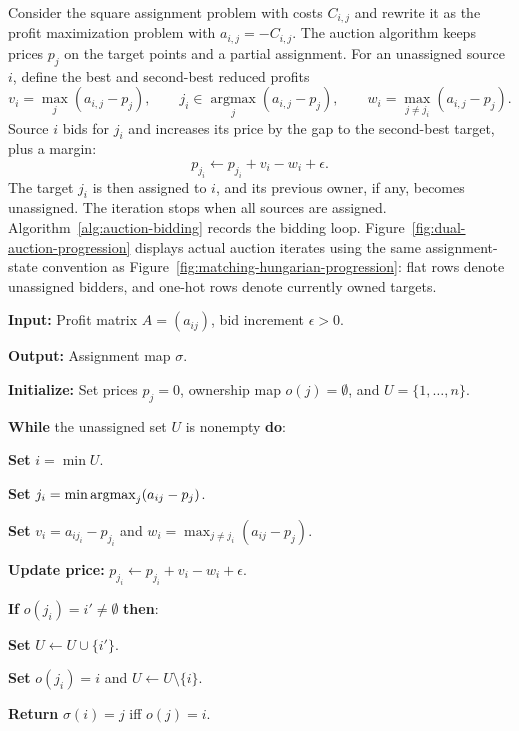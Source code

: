 Consider the square assignment problem with costs $C_{i,j}$ and rewrite it as the profit maximization problem with $a_{i,j}=-C_{i,j}$. The auction algorithm keeps prices $p_j$ on the target points and a partial assignment. For an unassigned source $i$, define the best and second-best reduced profits
\[
	v_i=\max_j (a_{i,j}-p_j),\qquad
	j_i\in\operatorname*{argmax}_j(a_{i,j}-p_j),\qquad
	w_i=\max_{j\neq j_i}(a_{i,j}-p_j).
\]
Source $i$ bids for $j_i$ and increases its price by the gap to the second-best target, plus a margin:
\[
	p_{j_i}\leftarrow p_{j_i}+v_i-w_i+\epsilon.
\]
The target $j_i$ is then assigned to $i$, and its previous owner, if any, becomes unassigned. The iteration stops when all sources are assigned. Algorithm~\ref{alg:auction-bidding} records the bidding loop. Figure~\ref{fig:dual-auction-progression} displays actual auction iterates using the same assignment-state convention as Figure~\ref{fig:matching-hungarian-progression}: flat rows denote unassigned bidders, and one-hot rows denote currently owned targets.

\begin{alg}\label{alg:auction-bidding}
\textbf{Input:} Profit matrix $A=(a_{ij})$, bid increment $\epsilon>0$.

\textbf{Output:} Assignment map $\sigma$.

\textbf{Initialize:} Set prices $p_j=0$, ownership map $o(j)=\emptyset$, and $U=\{1,\ldots,n\}$.

\textbf{While} the unassigned set $U$ is nonempty \textbf{do}:
\begin{algblock}
\textbf{Set} $i=\min U$.

\textbf{Set} $j_i=\min\operatorname{argmax}_j(a_{ij}-p_j)$.

\textbf{Set} \(v_i=a_{ij_i}-p_{j_i}\) and \(w_i=\max_{j\neq j_i}(a_{ij}-p_j)\).

\textbf{Update price:}
\(p_{j_i}\leftarrow p_{j_i}+v_i-w_i+\epsilon.\)

\textbf{If} $o(j_i)=i'\neq\emptyset$ \textbf{then}:
\begin{algblock}

\textbf{Set} $U\leftarrow U\cup\{i'\}$.

\end{algblock}
\textbf{Set} $o(j_i)=i$ and $U\leftarrow U\setminus\{i\}$.

\end{algblock}
\algreturnskip
\textbf{Return} $\sigma(i)=j$ iff $o(j)=i$.
\end{alg}

